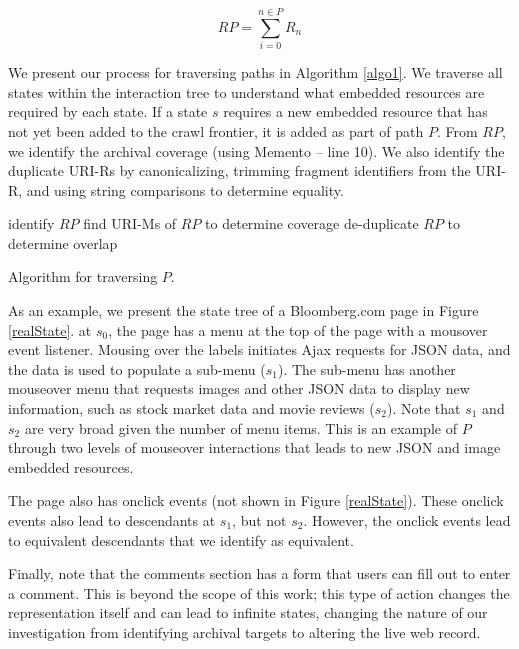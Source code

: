 \documentclass{sig-alternate}
\begin{document}
\begin{equation}
RP = \sum_{i=0}^{n \in P} R_n
\label{resourcepaths}
\end{equation}

We present our process for traversing paths in Algorithm \ref{algo1}. We traverse all states within the interaction tree to understand what embedded resources are required by each state. If a state $s$ requires a new embedded resource that has not yet been added to the crawl frontier, it is added as part of path $P$. From $RP$, we identify the archival coverage (using Memento -- line 10). We also identify the duplicate URI-Rs by canonicalizing, trimming fragment identifiers from the URI-R, and using string comparisons to determine equality.

\begin{algorithm}
identify $RP$\;
find URI-Ms of $RP$ to determine coverage\;
de-duplicate $RP$ to determine overlap\;

 \caption{Algorithm for traversing $P$.}
  \label{algo1}
\end{algorithm}



As an example, we present the state tree of a Bloomberg.com page in Figure \ref{realState}. at $s_0$, the page has a menu at the top of the page with a mousover event listener. Mousing over the labels initiates Ajax requests for JSON data, and the data is used to populate a sub-menu ($s_1$). The sub-menu has another mouseover menu that requests images and other JSON data to display new information, such as stock market data and movie reviews ($s_2$). Note that $s_1$ and $s_2$ are very broad given the number of menu items. This is an example of $P$ through two levels of mouseover interactions that leads to new JSON and image embedded resources. 

The page also has onclick events (not shown in Figure \ref{realState}). These onclick events also lead to descendants at $s_1$, but not $s_2$. However, the onclick events lead to equivalent descendants that we identify as equivalent.

Finally, note that the comments section has a form that users can fill out to enter a comment. This is beyond the scope of this work; this type of action changes the representation itself and can lead to infinite states, changing the nature of our investigation from identifying archival targets to altering the live web record.
\end{document}
